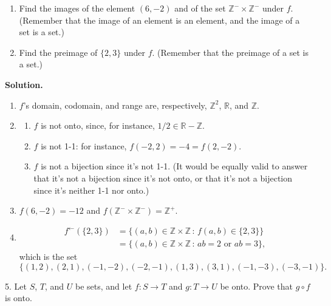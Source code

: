\documentclass[10pt,]{book}
\theoremstyle{plain}
\theoremstyle{definition}
\theoremstyle{definition}
\theoremstyle{definition}
\theoremstyle{definition}
\numberwithin{equation}{section}
\def\Z{\mathbb{Z}}
\def\R{\mathbb{R}}
\newcommand{\amp}{&}
\begin{document}
\begin{exerciselist}
\begin{enumerate}[label=(\alph*)]
\item\hypertarget{li-44}{}Find the images of the element \((6,-2)\) and of the set \(\Z^- \times \Z^-\) under \(f\). (Remember that the image of an element is an element, and the image of a set is a set.)%
\item\hypertarget{li-45}{}Find the preimage of \(\{2,3\}\) under \(f\). (Remember that the preimage of a set is a set.)%
\end{enumerate}
\par\smallskip
\par\smallskip
\noindent\textbf{Solution.}\hypertarget{solution-4}{}\quad
\leavevmode%
\begin{enumerate}[label=(\alph*)]
\item\hypertarget{li-46}{}\(f\)'s domain, codomain, and range are, respectively, \(\Z^2\), \(\R\), and \(\Z\).%
\item\hypertarget{li-47}{}%
\begin{enumerate}[label=\roman*.]
\item\hypertarget{li-48}{}\(f\) is not onto, since, for instance, \(1/2\in \R-\Z\).%
\item\hypertarget{li-49}{}\(f\) is not 1-1: for instance, \(f(-2,2)=-4=f(2,-2)\).%
\item\hypertarget{li-50}{}\(f\) is not a bijection since it's not 1-1. (It would be equally valid to answer that it's not a bijection since it's not onto, or that it's not a bijection since it's neither 1-1 nor onto.)%
\end{enumerate}
%
\item\hypertarget{li-51}{}\(f(6,-2)=-12\) and \(f(\Z^-\times \Z^-)=\Z^+\).%
\item\hypertarget{li-52}{}%
\begin{align*}
f^{\leftarrow}(\{2,3\})\amp =\{(a,b)\in \Z\times \Z\,:\, f(a,b)\in \{2,3\}\}\\
\amp =\{(a,b)\in \Z\times \Z\,:\, ab=2 \mbox{ or }  ab=3\},
\end{align*}
which is the set%
\begin{equation*}
\{(1,2),(2,1),(-1,-2),(-2,-1),(1,3),(3,1),(-1,-3),(-3,-1)\}.
\end{equation*}
%
\end{enumerate}
\item[5.]\hypertarget{exercise-5}{}Let \(S\), \(T\), and \(U\) be sets, and let \(f: S\to T\) and \(g: T\to U\) be onto. Prove that \(g \circ f\) is onto.%
\par\smallskip
\par\smallskip

\end{exerciselist}
\end{document}
